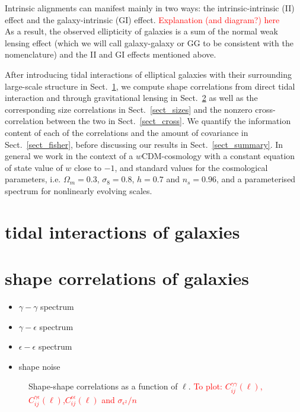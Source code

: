 \documentclass[a4paper,fleqn,usenatbib]{mnras}
\newcommand\BG[1]{\textcolor{red}{#1}}
\begin{document}
Intrinsic alignments can manifest mainly in two ways: the intrinsic-intrinsic (II) effect and the galaxy-intrinsic (GI) effect. \BG{Explanation (and diagram?) here}\\

As a result, the observed ellipticity of galaxies is a sum of the normal weak lensing effect (which we will call galaxy-galaxy or GG to be consistent with the nomenclature) and the II and GI effects mentioned above.


After introducing tidal interactions of elliptical galaxies with their surrounding large-scale structure in Sect.~\ref{sect_tidal}, we compute shape correlations from direct tidal interaction and through gravitational lensing in Sect.~\ref{sect_shapes} as well as the corresponding size correlations in Sect.~\ref{sect_sizes} and the nonzero cross-correlation between the two in Sect.~\ref{sect_cross}. We quantify the information content of each of the correlations and the amount of covariance in Sect.~\ref{sect_fisher}, before discussing our results in Sect.~\ref{sect_summary}. In general we work in the context of a $w$CDM-cosmology with a constant equation of state value of $w$ close to $-1$, and standard values for the cosmological parameters, i.e. $\Omega_m = 0.3$, $\sigma_8 =  0.8$, $h = 0.7$ and $n_s = 0.96$, and a parameterised spectrum for nonlinearly evolving scales.


\section{tidal interactions of galaxies}\label{sect_tidal}


\section{shape correlations of galaxies}\label{sect_shapes}
\begin{itemize}
    \item $\gamma-\gamma$ spectrum 
    \item $\gamma-\epsilon$ spectrum
    \item $\epsilon-\epsilon$ spectrum
    \item shape noise
\end{itemize}


\begin{figure}
\centering
\caption{Shape-shape correlations as a function of $\ell$. \BG{To plot: $C_{ij}^{\gamma\gamma}(\ell)$,$C_{ij}^{\gamma\epsilon}(\ell)$,$C_{ij}^{\epsilon\epsilon}(\ell)$ and $\sigma_{\epsilon^2}/n$}}
\label{fig:shapeshape}
\end{figure}
\end{document}

